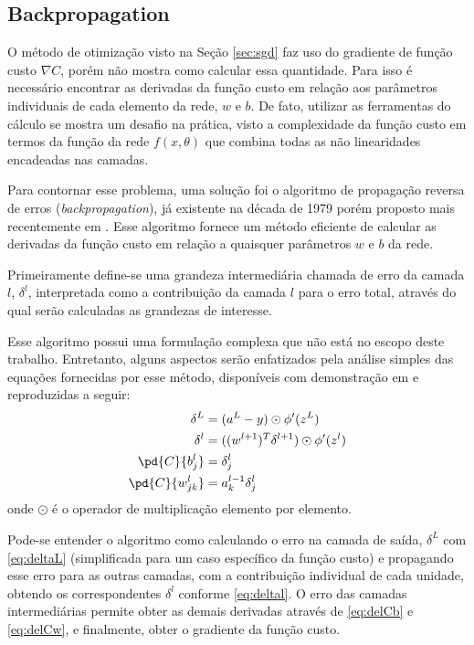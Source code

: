 \subsection{Backpropagation}
\label{sub-sec:backprop}

O método de otimização visto na Seção \ref{sec:sgd} faz uso do gradiente de função custo $\nabla C$, porém não mostra como calcular essa quantidade. Para isso é necessário encontrar as derivadas da função custo em relação aos parâmetros individuais de cada elemento da rede, $w$ e $b$. De fato, utilizar as ferramentas do cálculo se mostra um desafio na prática, visto a complexidade da função custo em termos da função da rede $f(x, \theta)$ que combina todas as não linearidades encadeadas nas camadas. 

Para contornar esse problema, uma solução foi o algoritmo de propagação reversa de erros (\textit{backpropagation}), já existente na década de 1979 porém proposto mais recentemente em \cite{backpropagation}. Esse algoritmo fornece um método eficiente de calcular as derivadas da função custo em relação a quaisquer parâmetros $w$ e $b$ da rede.

Primeiramente define-se uma grandeza intermediária chamada de erro da camada $l$, $\delta^l$, interpretada como a contribuição da camada $l$ para o erro total, através do qual serão calculadas as grandezas de interesse.

Esse algoritmo possui uma formulação complexa que não está no escopo deste trabalho. Entretanto, alguns aspectos serão enfatizados pela análise simples das equações fornecidas por esse método, disponíveis com demonstração em \cite{NeuralNetsDeep} e reproduzidas a seguir:
\begin{align}
\delta^L &= (a^L - y) \odot \phi^\prime(z^L) \label{eq:deltaL} \\ 
\delta^l &= ((w^{l+1})^T\delta^{l+1}) \odot \phi^\prime(z^l) \label{eq:deltal}\\
\pd{C}{b_j^l{}} &= \delta_j^l \label{eq:delCb}\\ 
\pd{C}{w_{jk}^l{}} &= a_k^{l-1} \delta_j^l \label{eq:delCw}
\end{align}
onde $\odot$ é o operador de multiplicação elemento por elemento.

Pode-se entender o algoritmo como calculando o erro na camada de saída, $\delta^L$ com \eqref{eq:deltaL} (simplificada para um caso específico da função custo) e propagando esse erro para as outras camadas, com a contribuição individual de cada unidade, obtendo os correspondentes $\delta^l$ conforme \eqref{eq:deltal}. O erro das camadas intermediárias permite obter as demais derivadas através de \eqref{eq:delCb} e \eqref{eq:delCw}, e finalmente, obter o gradiente da função custo. 

